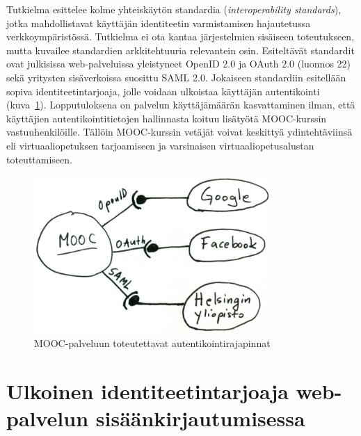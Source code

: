 \documentclass[finnish,gradu]{tktltiki}
\begin{document}
  Tutkielma esittelee kolme yhteiskäytön standardia (\emph{interoperability standards}), jotka mahdollistavat käyttäjän identiteetin varmistamisen hajautetussa verkkoympäristössä. Tutkielma ei ota kantaa järjestelmien sisäiseen toteutukseen, mutta kuvailee  standardien arkkitehtuuria relevantein osin. Esiteltävät standardit ovat julkisissa web-palveluissa yleistyneet OpenID 2.0 ja OAuth 2.0 (luonnos 22) sekä yritysten sisäverkoissa suosittu SAML 2.0. Jokaiseen standardiin esitellään sopiva identiteetintarjoaja, jolle voidaan ulkoistaa käyttäjän autentikointi (kuva~\ref{fig:mooc-autentikointirajapinnat}). Lopputuloksena on palvelun käyttäjämäärän kasvattaminen ilman, että käyttäjien autentikointitietojen hallinnasta koituu lisätyötä MOOC-kurssin vastuuhenkilöille. Tällöin MOOC-kurssin vetäjät voivat keskittyä ydintehtäviinsä eli virtuaaliopetuksen tarjoamiseen ja varsinaisen virtuaaliopetusalustan toteuttamiseen.


  \begin{figure}
    \centering
    \includegraphics[width=0.8\textwidth]{images/mooc-autentikointirajapinnat.jpg}
    \caption{MOOC-palveluun toteutettavat autentikointirajapinnat}
    \label{fig:mooc-autentikointirajapinnat}
  \end{figure}




\section{Ulkoinen identiteetintarjoaja web-palvelun sisäänkirjautumisessa} %
\label{sec:ulkoisen_identiteettipalvelun_käyttö_web_palvelun_sisäänkirjautumisessa}
\end{document}
